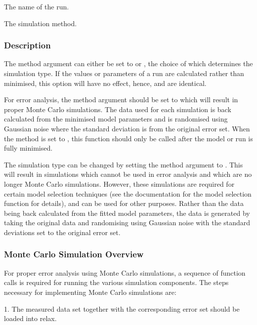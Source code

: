    The name of the run.   

   The simulation method.  

  

  
 \subsubsection{Description} 

 The method argument can either be set to  or , the choice of which determines the simulation type.  If the values or parameters of a run are calculated rather than minimised, this option will have no effect, hence,  and  are identical. 
  

 For error analysis, the method argument should be set to  which will result in proper Monte Carlo simulations.  The data used for each simulation is back calculated from the minimised model parameters and is randomised using Gaussian noise where the standard deviation is from the original error set.  When the method is set to , this function should only be called after the model or run is fully minimised. 
  

 The simulation type can be changed by setting the method argument to .  This will result in simulations which cannot be used in error analysis and which are no longer Monte Carlo simulations.  However, these simulations are required for certain model selection techniques (see the documentation for the model selection function for details), and can be used for other purposes.  Rather than the data being back calculated from the fitted model parameters, the data is generated by taking the original data and randomising using Gaussian noise with the standard deviations set to the original error set. 
  

  
 \subsubsection{Monte Carlo Simulation Overview} 

 For proper error analysis using Monte Carlo simulations, a sequence of function calls is required for running the various simulation components.  The steps necessary for implementing Monte Carlo simulations are: 
  

 1.  The measured data set together with the corresponding error set should be loaded into relax. 
  

